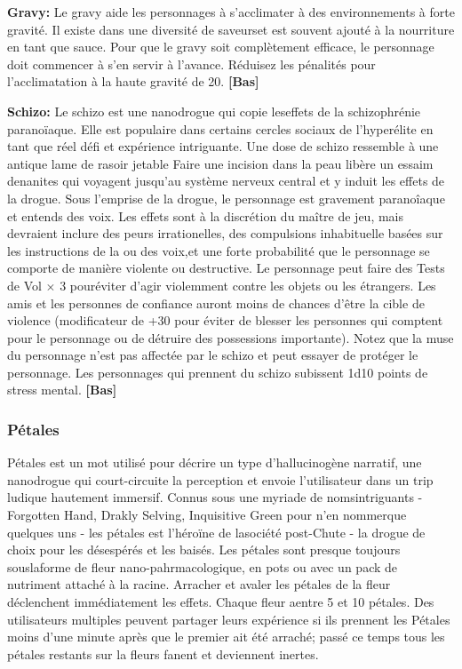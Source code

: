 \textbf{Gravy:} Le gravy aide les personnages à s'acclimater à des environnements à forte gravité. Il existe dans une diversité de saveurset est souvent ajouté à la nourriture en tant que sauce. Pour que le gravy soit complètement efficace, le personnage doit commencer à s'en servir à l'avance. Réduisez les pénalités pour l'acclimatation à la haute gravité de 20. \textbf{[Bas]} 

\textbf{Schizo:} Le schizo est une nanodrogue qui copie leseffets de la schizophrénie paranoïaque. Elle est populaire dans certains cercles sociaux de l'hyperélite en tant que réel défi et expérience intriguante. Une dose de schizo ressemble à une antique lame de rasoir jetable Faire une incision dans la peau libère un essaim denanites qui voyagent jusqu'au système nerveux central et y induit les effets de la drogue. Sous l'emprise de la drogue, le personnage est gravement paranoîaque et entends des voix. Les effets sont à la discrétion du maître de jeu, mais devraient inclure des peurs irrationelles, des compulsions inhabituelle basées sur les instructions de la ou des voix,et une forte probabilité que le personnage se comporte de manière violente ou destructive. Le personnage peut faire des Tests de Vol $\times$ 3 pouréviter d'agir violemment contre les objets ou les étrangers. Les amis et les personnes de confiance auront moins de chances d'être la cible de violence (modificateur de +30 pour éviter de blesser les personnes qui comptent pour le personnage ou de détruire des possessions importante). Notez que la muse du personnage n'est pas affectée par le schizo et peut essayer de protéger le personnage. Les personnages qui prennent du schizo subissent 1d10 points de stress mental. \textbf{[Bas]} 

\subsubsection{Pétales} 

Pétales est un mot utilisé pour décrire un type d'hallucinogène narratif, une nanodrogue qui court-circuite la perception et envoie l'utilisateur dans un trip ludique hautement immersif. Connus sous une myriade de nomsintriguants - Forgotten Hand, Drakly Selving, Inquisitive Green pour n'en nommerque quelques uns - les pétales est l'héroïne de lasociété post-Chute - la drogue de choix pour les désespérés et les baisés. Les pétales sont presque toujours souslaforme de fleur nano-pahrmacologique, en pots ou avec un pack de nutriment attaché à la racine. Arracher et avaler les pétales de la fleur déclenchent immédiatement les effets. Chaque fleur aentre 5 et 10 pétales. Des utilisateurs multiples peuvent partager leurs expérience si ils prennent les Pétales moins d'une minute après que le premier ait été arraché; passé ce temps tous les pétales restants sur la fleurs fanent et deviennent inertes. 


